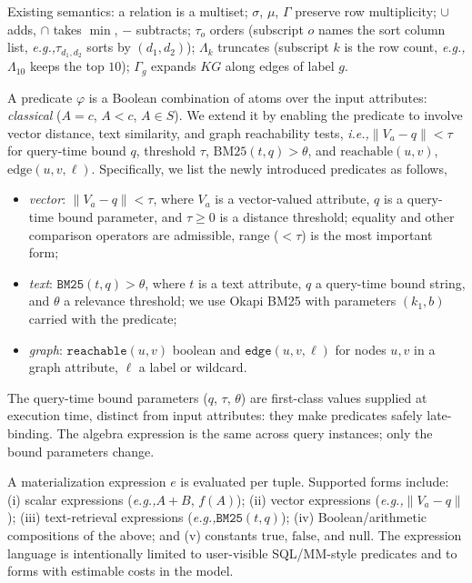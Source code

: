 \documentclass[sigconf]{acmart}
\theoremstyle{plain}
\theoremstyle{definition}
\newcommand{\KG}{\mathit{KG}}
\newcommand{\ie}{\emph{i.e.,}\xspace}
\newcommand{\eg}{\emph{e.g.,}\xspace}
\theoremstyle{remark}
\begin{document}
Existing semantics: a relation is a multiset; $\sigma$, $\mu$, $\Gamma$ preserve row multiplicity; $\cup$ adds, $\cap$ takes $\min$, $-$ subtracts; $\tau_o$ orders (subscript $o$ names the sort column list, \eg $\tau_{d_1,d_2}$ sorts by $(d_1,d_2)$); $\Lambda_k$ truncates (subscript $k$ is the row count, \eg $\Lambda_{10}$ keeps the top $10$); $\Gamma_g$ expands $\KG$ along edges of label $g$.

A predicate $\varphi$ is a Boolean combination of atoms over the input attributes: \emph{classical} ($A = c$, $A < c$, $A \in S$). We extend it by enabling the predicate to involve vector distance, text similarity, and graph reachability tests, \ie $\lVert V_a - q\rVert < \tau$ for query-time bound $q$, threshold $\tau$, $\mathrm{BM25}(t, q) > \theta$, and $\mathrm{reachable}(u, v)$, $\mathrm{edge}(u, v, \ell)$. Specifically, we list the newly introduced predicates as follows,
\begin{itemize}
    \item \emph{vector}: $\lVert V_a - q\rVert < \tau$, where $V_a$ is a vector-valued attribute, $q$ is a query-time bound parameter, and $\tau \geq 0$ is a distance threshold; equality and other comparison operators are admissible, range ($< \tau$) is the most important form;
    \item \emph{text}: $\texttt{BM25}(t, q) > \theta$, where $t$ is a text attribute, $q$ a query-time bound string, and $\theta$ a relevance threshold; we use Okapi BM25 with parameters $(k_1, b)$ carried with the predicate;
    \item \emph{graph}: $\texttt{reachable}(u, v)$ boolean and $\texttt{edge}(u, v, \ell)$
for nodes $u, v$ in a graph attribute, $\ell$ a label or wildcard.
\end{itemize}
The query-time bound parameters ($q$, $\tau$, $\theta$) are first-class values supplied at execution time, distinct from input attributes: they make predicates safely late-binding. The algebra expression is the same across query instances; only the bound  parameters change.

A materialization expression \(e\) is evaluated per tuple. Supported forms include: (i) scalar expressions (\eg \(A+B\), \(f(A)\)); (ii) vector expressions (\eg \(\lVert V_a-q\rVert\)); (iii) text-retrieval expressions (\eg \(\texttt{BM25}(t,q)\)); (iv) Boolean/arithmetic compositions of the above; and (v) constants \(\mathrm{true}\), \(\mathrm{false}\), and \(\mathrm{null}\). The expression language is intentionally limited to user-visible SQL/MM-style predicates and to forms with estimable costs in the model.
\end{document}
